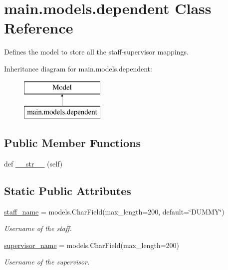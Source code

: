 \hypertarget{classmain_1_1models_1_1dependent}{}\section{main.\+models.\+dependent Class Reference}
\label{classmain_1_1models_1_1dependent}


Defines the model to store all the staff-\/supervisor mappings.  


Inheritance diagram for main.\+models.\+dependent\+:\begin{figure}[H]
\begin{center}
\leavevmode
\includegraphics[height=2.000000cm]{classmain_1_1models_1_1dependent}
\end{center}
\end{figure}
\subsection*{Public Member Functions}
\begin{DoxyCompactItemize}
\item 
def \hyperlink{classmain_1_1models_1_1dependent_a03bbd4008311076414605382595dd174}{\+\_\+\+\_\+str\+\_\+\+\_\+} (self)
\end{DoxyCompactItemize}
\subsection*{Static Public Attributes}
\begin{DoxyCompactItemize}
\item 
\hyperlink{classmain_1_1models_1_1dependent_a73f6cd97e7cabd931b7d543ac1fb04ba}{staff\+\_\+name} = models.\+Char\+Field(max\+\_\+length=200, default=\char`\"{}D\+U\+M\+MY\char`\"{})
\begin{DoxyCompactList}\small\item\em Username of the staff. \end{DoxyCompactList}\item 
\hyperlink{classmain_1_1models_1_1dependent_a2a9f10a83b2253ec10314e4d044f00c0}{supervisor\+\_\+name} = models.\+Char\+Field(max\+\_\+length=200)
\begin{DoxyCompactList}\small\item\em Username of the supervisor. \end{DoxyCompactList}\end{DoxyCompactItemize}


